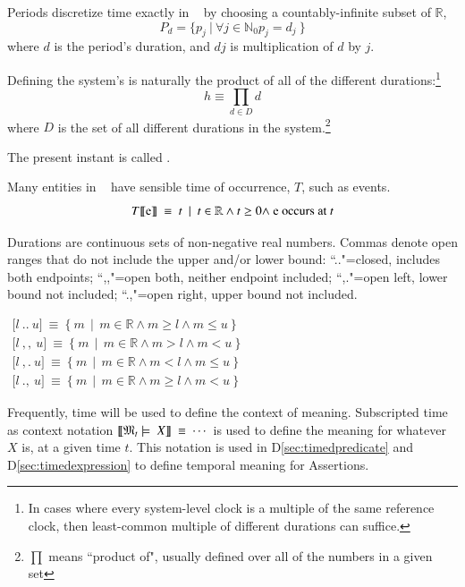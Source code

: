\pn Periods discretize time exactly in \lang~ by choosing a countably-infinite subset of $\mathbb{R}$,
\[P_{d}=\{p_{j}~\vert~\forall j\in\mathbb{N}_{0} p_{j}=d_{j}~\}\]
where $d$ is the period's duration, and $dj$ is multiplication of $d$ by $j$.

\pn Defining the system's  is naturally the product of all of the different 
durations:\footnote{In cases where every system-level clock is a multiple of the same reference clock, then least-common multiple of different durations can suffice.}
\[h\equiv\prod_{d\in D} d\]
where $D$ is the set of all different durations in the system.\footnote{$\prod$ means ``product of", usually defined over all of the numbers in a given set}  

\pn The present instant is called .

\pn Many entities in \lang~ have sensible time of occurrence, %
$T$, such as events.
\[T\llbracket $e$\rrbracket~\equiv~t~ ~\vert~~t\in\mathbb{R}\wedge t\ge0 \wedge ~$e occurs at$~t\]

\pn   Durations are continuous sets of non-negative real numbers.  Commas denote open ranges that do not include the upper and/or lower bound: ``.."=closed, includes both endpoints;
``,,"=open both, neither endpoint included;
``,."=open left, lower bound not included;
``.,"=open right, upper bound not included.

\(
\begin{array}{l}
\lbrack l~..~u\rbrack~\equiv~ \{~m~~\vert~~m\in\mathbb{R}\wedge m\ge l\wedge m\le u~\} \\
\lbrack l~,,~u\rbrack~\equiv~ \{~m~~\vert~~m\in\mathbb{R}\wedge m>l\wedge m<u~\} \\
\lbrack l~,.~u\rbrack~\equiv~ \{~m~~\vert~~m\in\mathbb{R}\wedge m<l\wedge m\le u~\} \\
\lbrack l~.,~u\rbrack~\equiv~ \{~m~~\vert~~m\in\mathbb{R}\wedge m\ge l\wedge m<u~\}
\end{array}
\)

\pn Frequently, time will be used to define the context of meaning.  Subscripted time as context notation
\(\mdx{X}{t}~\equiv~\cdots \)
is used to define the meaning for whatever $X$ is, at a given time $t$.  This notation is used in 
D\ref{sec:timedpredicate} and D\ref{sec:timedexpression} to define temporal meaning for Assertions.


